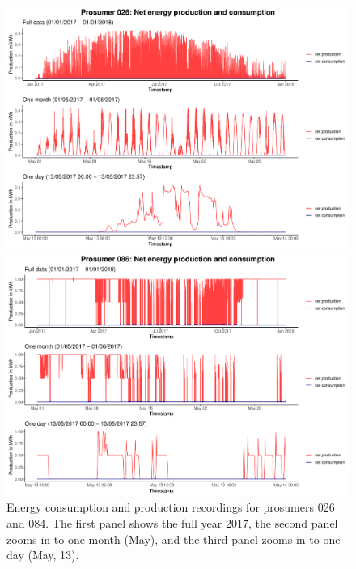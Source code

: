 \begin{figure}
\centering
\begin{minipage}[h]{\dimexpr.5\textwidth-0.15em}
\includegraphics[width=\textwidth]{thesis/graphs/timeseries/p026_prod&cons.pdf}
\end{minipage}
\begin{minipage}[h]{\dimexpr.5\textheight-0.15em}
\includegraphics[width=\textwidth]{thesis/graphs/timeseries/p086_prod&cons.pdf}
\end{minipage}

\caption[Energy consumption and production recordings for prosumers 026 and 084]{Energy consumption and production recordings for prosumers 026 and 084. The first panel shows the full year 2017, the second panel zooms in to one month (May), and the third panel zooms in to one day (May, 13). \quantnet}
\label{Fig:energyconsprod_p026p086}

\end{figure}

